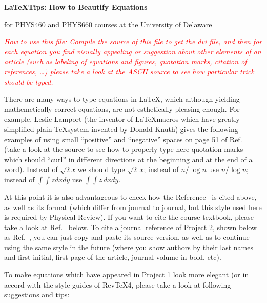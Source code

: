 \documentclass[12pt]{article}
\begin{document}
\centerline{\bf \huge \LaTeX Tips: How to Beautify Equations}

\smallskip

\centerline{\footnotesize{for PHYS460 and PHYS660 courses at the University of Delaware}}

\bigskip

\textcolor{red}{\em \underline{How to use this file:} Compile the source of this file to get the dvi file, 
and then for each equation you find visually appealing or suggestion about other elements of an article (such as labeling of equations and figures, quotation marks, citation of references, \dots) please take a look at the ASCII source to see how particular trick should be typed.} 

\bigskip

There are many ways to type equations in \LaTeX, which although yielding mathemetically correct equations, 
are not esthetically pleasing enough. For example, Leslie Lamport (the inventor of \LaTeX macros which have greatly simplified plain \TeX system invented by Donald Knuth)  gives the following examples  of using small ``positive'' and ``negative'' spaces on page 51 of Ref.~\cite{lamport} (take a look at the source to see how to properly type here quotation marks which should ``curl'' in different directions at the beginning and at the end of a word).  Instead of $\sqrt{2}x$ we should type $\sqrt{2} \, x$; instead of $n / \log n$ use $n / \! \log n$; instead of $\int \int z dx dy$ use $\int \! \! \int z \, dx dy$.

At this point it is also advantageous to check how the Reference~\cite{lamport} is cited above, as well as its format (which differ from journal to journal, but this style used here is required by Physical Review). If you want to cite the course textbook, please take a look at Ref.~\cite{giordano} below. To cite a journal reference of Project 2, shown below as Ref.~\cite{whelan}, you can just copy and paste its source version, as well as to continue using the same style in the future (where you show authors by their last names and first initial, first page of the article, journal volume in bold, etc).

To make equations which have appeared in Project 1 look more elegant (or in accord with the style guides of 
Rev\TeX4, please take a look at following suggestions and tips:
\end{document}
